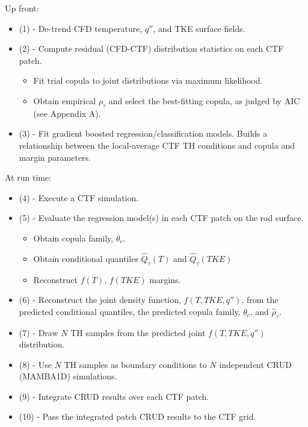 Up front:
\begin{itemize}
\item (1) - De-trend CFD temperature, $q''$, and TKE surface fields.	
\item (2) - Compute residual (CFD-CTF) distribution statistics on each CTF patch.
	\begin{itemize}
	\item  Fit trial copula to joint distributions via maximum likelihood. 
	\item  Obtain empirical $\rho_\tau$ and select the best-fitting copula, as judged by AIC (see Appendix A). 
	\end{itemize}
\item (3) - Fit gradient boosted regression/classification models.  Builds a relationship between the local-average CTF TH conditions and copula and margin parameters.
\end{itemize}
At run time:
\begin{itemize}
\item (4) - Execute a CTF simulation.
\item (5) - Evaluate the regression model(s) in each CTF patch on the rod surface.
	\begin{itemize}
	\item  Obtain copula family, $\theta_c$.
	\item  Obtain conditional quantiles $\hat Q_\tau(T)$ and $\hat Q_\tau(TKE)$ 
	\item  Reconstruct $f(T)$, $f(TKE)$ margins.
	\end{itemize}
\item (6) - Reconstruct the joint density function, $f(T, TKE, q'')$, from the predicted conditional quantiles, the predicted copula family, $\theta_c$, and $\hat \rho_\tau$.
\item (7) - Draw $N$ TH samples from the predicted joint $f(T, TKE, q'')$ distribution.  
\item (8) - Use $N$ TH samples as boundary conditions to $N$ independent CRUD (MAMBA1D) simulations.
\item (9) - Integrate CRUD results over each CTF patch.
\item (10) - Pass the integrated patch CRUD results to the CTF grid.
\end{itemize}
